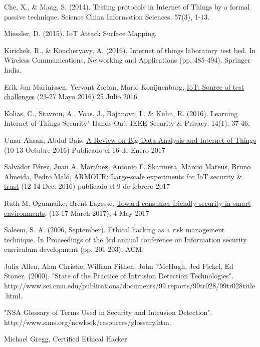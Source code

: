 \documentclass[a4paper,english,11pt]{article}
\begin{document}
\begin{thebibliography}{9}
		Che, X., \& Maag, S. (2014). Testing protocols in Internet of Things by a formal passive technique. Science China Information Sciences, 57(3), 1-13.
		
		Miessler, D. (2015). IoT Attack Surface Mapping.
		
		Kirichek, R., \& Koucheryavy, A. (2016). Internet of things laboratory test bed. In Wireless Communications, Networking and Applications (pp. 485-494). Springer India.
		
		Erik Jan Marinissen, Yervant Zorian, Mario Konijnenburg, \href{http://ieeexplore.ieee.org/document/7519331/}{IoT: Source of test challenges} (23-27 Mayo 2016) 25 Julio 2016
		
		Kolias, C., Stavrou, A., Voas, J., Bojanova, I., \& Kuhn, R. (2016). Learning Internet-of-Things Security" Hands-On". IEEE Security \& Privacy, 14(1), 37-46.
		
		Umar Ahsan, Abdul Bais, \href{http://ieeexplore.ieee.org/stamp/stamp.jsp?arnumber=7815042&tag=1}{A Review on Big Data Analysis and Internet of Things} (10-13 Octubre 2016) Publicado el 16 de Enero 2017
		
		Salvador Pérez, Juan A. Martínez, Antonio F. Skarmeta, Márcio Mateus, Bruno Almeida, Pedro Maló, \href{http://ieeexplore.ieee.org/document/7845504/}{ARMOUR: Large-scale experiments for IoT security \& trust}
		(12-14 Dec. 2016) publicado el 9 de febrero 2017
		
		Ruth M. Ogunnaike; Brent Lagesse, \href{http://ieeexplore.ieee.org/document/7917633/}{Toward consumer-friendly security in smart environments}, (13-17 March 2017), 4 May 2017
		
		Saleem, S. A. (2006, September). Ethical hacking as a risk management technique. In Proceedings of the 3rd annual conference on Information security curriculum development (pp. 201-203). ACM.
		
	    Julia Allen, Alan Christie, William Fithen, John ?McHugh, Jed Pickel, Ed Stoner. (2000). "State of the Practice of Intrusion Detection Technologies". http://www.sei.cmu.edu/publications/documents/99.reports/99tr028/99tr028title.html.
	    
        "NSA Glossary of Terms Used in Security and Intrusion Detection". http://www.sans.org/newlook/resources/glossary.htm.
        
         Michael Gregg, Certified Ethical Hacker
	\end{thebibliography}
	
\end{document}
